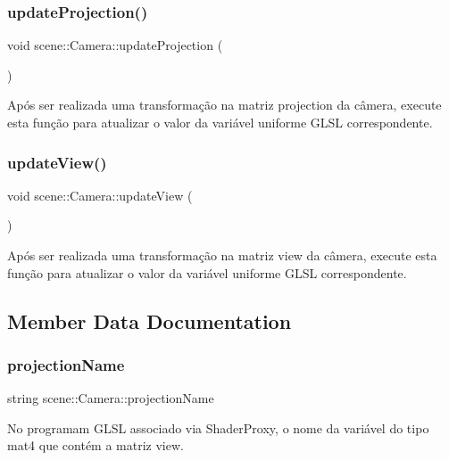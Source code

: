\subsubsection{\texorpdfstring{update\+Projection()}{updateProjection()}}
{\footnotesize\ttfamily void scene\+::\+Camera\+::update\+Projection (\begin{DoxyParamCaption}{ }\end{DoxyParamCaption})\hspace{0.3cm}{\ttfamily [inline]}}

Após ser realizada uma transformação na matriz projection da câmera, execute esta função para atualizar o valor da variável uniforme G\+L\+SL correspondente. \mbox{\label{classscene_1_1_camera_abf4d10335c5edecae6a7a746e2de4ee1}} 
\subsubsection{\texorpdfstring{update\+View()}{updateView()}}
{\footnotesize\ttfamily void scene\+::\+Camera\+::update\+View (\begin{DoxyParamCaption}{ }\end{DoxyParamCaption})\hspace{0.3cm}{\ttfamily [inline]}}

Após ser realizada uma transformação na matriz view da câmera, execute esta função para atualizar o valor da variável uniforme G\+L\+SL correspondente. 

\subsection{Member Data Documentation}
\mbox{\label{classscene_1_1_camera_ac121b93d89f62b2e7537c644f57d6464}} 
\subsubsection{\texorpdfstring{projection\+Name}{projectionName}}
{\footnotesize\ttfamily string scene\+::\+Camera\+::projection\+Name}

No programam G\+L\+SL associado via Shader\+Proxy, o nome da variável do tipo mat4 que contém a matriz view. \mbox{\label{classscene_1_1_camera_a114ec90a596436a0598685d877f6b9d6}} 
